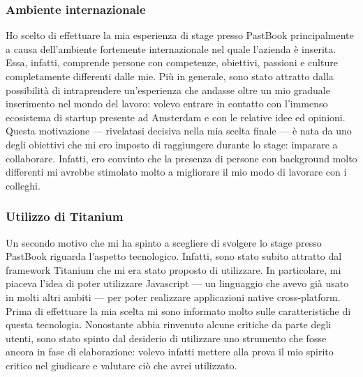 			\subsubsection{Ambiente internazionale}
				Ho scelto di effettuare la mia esperienza di stage presso PastBook principalmente a causa dell'ambiente fortemente
				internazionale nel quale l'azienda è inserita. Essa, infatti, comprende persone con competenze, obiettivi, passioni
				e culture completamente differenti dalle mie. Più in generale, sono stato attratto dalla possibilità di intraprendere
				un'esperienza che andasse oltre un mio graduale inserimento nel mondo del lavoro: volevo entrare in contatto con
				l'immenso ecosistema di startup presente ad Amsterdam e con le relative idee ed opinioni.\\
				Questa motivazione — rivelatasi decisiva nella mia scelta finale — è nata da uno degli obiettivi che mi ero imposto
				di raggiungere durante lo stage: imparare a collaborare. Infatti, ero convinto che la presenza di persone con
				background molto differenti mi avrebbe stimolato molto a migliorare il mio modo di lavorare con i colleghi.
			\subsubsection{Utilizzo di Titanium}
				Un secondo motivo che mi ha spinto a scegliere di svolgere lo stage presso PastBook riguarda l'aspetto tecnologico.
				Infatti, sono stato subito attratto dal framework Titanium che mi era stato proposto di utilizzare. In particolare,
				mi piaceva l'idea di poter utilizzare Javascript — un linguaggio che avevo già usato in molti altri ambiti — per
				poter realizzare applicazioni native cross-platform.\\
				Prima di effettuare la mia scelta mi sono informato molto sulle caratteristiche di questa tecnologia. Nonostante
				abbia rinvenuto alcune critiche da parte degli utenti, sono stato spinto dal desiderio di utilizzare uno strumento
				che fosse ancora in fase di elaborazione: volevo infatti mettere alla prova il mio spirito critico nel giudicare e
				valutare ciò che avrei utilizzato.
